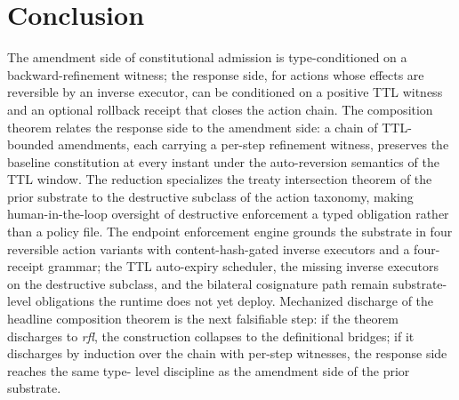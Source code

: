 \section{Conclusion}
\label{sec:conclusion-ra}

The amendment side of constitutional admission is type-conditioned on
a backward-refinement witness; the response side, for actions whose
effects are reversible by an inverse executor, can be conditioned on
a positive TTL witness and an optional rollback receipt that closes
the action chain. The composition theorem
 relates the
response side to the amendment side: a chain of TTL-bounded
amendments, each carrying a per-step refinement witness, preserves
the baseline constitution at every instant under the auto-reversion
semantics of the TTL window. The reduction
 specializes the
treaty intersection theorem of the prior substrate
\cite{programmableSovereigntyAnonymous} to the destructive
subclass of the action taxonomy, making human-in-the-loop oversight
of destructive enforcement a typed obligation rather than a policy
file. The endpoint enforcement engine grounds the substrate in four
reversible action variants with content-hash-gated inverse executors
and a four-receipt grammar; the TTL auto-expiry scheduler, the
missing inverse executors on the destructive subclass, and the
bilateral cosignature path remain substrate-level obligations the
runtime does not yet deploy. Mechanized discharge of the headline
composition theorem is the next falsifiable step: if the theorem
discharges to \emph{rfl}, the construction collapses to the
definitional bridges; if it discharges by induction over the chain
with per-step witnesses, the response side reaches the same type-
level discipline as the amendment side of the prior substrate.
